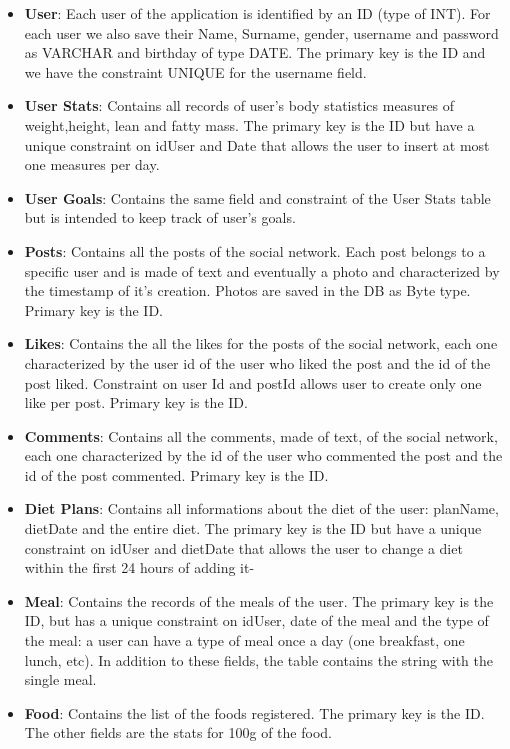 \newpage
\begin{itemize}
    \item \textbf{User}: Each user of the application is identified by an ID (type of INT). For each user we also save
their Name, Surname, gender, username and password as VARCHAR and birthday of type DATE. The primary key is the ID and we have the constraint UNIQUE for the username field.
    \item \textbf{User Stats}: Contains all records of user's body statistics measures of weight,height, lean and fatty mass. The primary key is the ID but have a unique constraint on idUser and Date that allows the user to insert at most one measures per day.
    \item \textbf{User Goals}: Contains the same field and constraint of the User Stats table but is intended to keep track of user's goals.
    \item \textbf{Posts}: Contains all the posts of the social network. Each post belongs to a specific user and is made of text and eventually a photo and characterized by the timestamp of it's creation. Photos are saved in the DB as Byte type. Primary key is the ID.  
    \item \textbf{Likes}: Contains the all the likes for the posts of the social network, each one characterized by the user id of the user who liked the post and the id of the post liked. Constraint on user Id and postId allows user to create only one like per post. Primary key is the ID.
    \item \textbf{Comments}: Contains all the comments, made of text, of the social network, each one characterized by the id of the user who commented the post and the id of the post commented. Primary key is the ID. 
    \item \textbf{Diet Plans}: Contains all informations about the diet of the user: planName, dietDate and the entire diet. The primary key is the ID but have a unique constraint on idUser and dietDate that allows the user to change a diet within the first 24 hours of adding it-
    \item \textbf{Meal}: Contains the records of the meals of the user. The primary key is the ID, but has a unique constraint on idUser, date of the meal and the type of the meal: a user can have a type of meal once a day (one breakfast, one lunch, etc). In addition to these fields, the table contains the string with the single meal.
    \item \textbf{Food}: Contains the list of the foods registered. The primary key is the ID. The other fields are the stats for 100g of the food.

\end{itemize}
